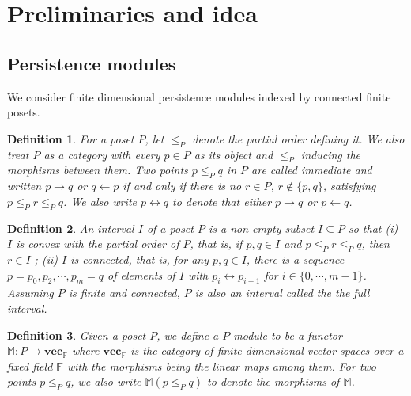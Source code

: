 \documentclass[11pt]{article}
\theoremstyle{plain}%
\newtheorem{definition}{Definition}[section]
\newcommand{\Interval}{\mathbf{Int}}
\newcommand{\vecsp}{\mathbf{vec}_{\mathbb{F}}}
\newcommand{\M}{\mathbb{M}}
\newcommand{\Z}{\mathbb{Z}}
\newcommand{\cheng}[1]		{{ \textcolor{darkred} { #1}}}
\begin{document}
\section{Preliminaries and idea} \label{sec:genrank}
\subsection{Persistence modules}
We consider finite dimensional persistence modules indexed by connected finite posets. 
\begin{definition}For a poset $P$, let $\leq_P$ denote the partial order defining it. We also treat $P$ as a category with every $p\in P$ as its object and $\leq_P$ inducing the morphisms between them. Two points $p\leq_P q$ in $P$ are called \emph{immediate} and written $p\rightarrow q$ or $q \leftarrow p$ if and only if there is no $r\in P$, $r\not\in\{ p,q\}$, satisfying $p\leq_P r \leq_P q$. We also
write $p\leftrightarrow q$ to denote that either $p\rightarrow q$ or
$p\leftarrow q$.
\end{definition}
\begin{definition}\label{def:intervals}
An \emph{interval} $I$ of a poset $P$ is a non-empty subset $I\subseteq P$ so that	
(i) $I$ is convex with the partial order of $P$, that is, if $p,q\in I$ and $p\leq_P r\leq_P q$, then $r\in I$ \label{item:convexity};
(ii) $I$ is \emph{connected}, that is, for any $p,q\in I$, there is a sequence $p=p_0,	p_2,\cdots,p_m=q$ of elements of $I$ with $p_i\leftrightarrow p_{i+1}$ for $i\in \{0,\cdots, m-1\}$\label{item:interval3}.
Assuming $P$ is finite and connected, $P$ is also an interval
called the \emph{the full interval}.
\end{definition}

\begin{definition}
Given a poset $P$, we define a $P$-module to be a functor $\M:P\rightarrow \vecsp$ where
$\vecsp$ is the category of finite dimensional vector spaces over a fixed field $\mathbb{F}$ with the
morphisms being the
linear maps among them. 
For two points
$p\leq_P q$, we also write $\M(p\leq_P q)$ to denote the 
morphisms of $\M$.
\end{definition}
\end{document}
